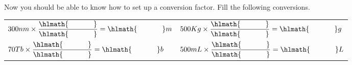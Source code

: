 \documentclass[main.tex]{subfiles}
\begin{document}
\begin{steps}
\begin{center}
\begin{tabular}{ p{6cm}   p{6cm}  }
 \end{tabular}\end{center}\vspace{.1cm}
   
         \newstep[]  Now you should be able to know how to set up a conversion factor. Fill the following conversions.

\begin{center}
 \begin{tabular}{ p{6cm}   p{6cm}  }
 $300nm	\times\dfrac{\hlmath{\hspace{35pt }}}{\hlmath{\hspace{35pt }}}=\hlmath{\hspace{35pt }}m$				&
 $500Kg\times\dfrac{\hlmath{\hspace{35pt }}}{\hlmath{\hspace{35pt }}}=\hlmath{\hspace{35pt }}g$							\\[0.5cm]     
 
  $70Tb\times\dfrac{\hlmath{\hspace{35pt }}}{\hlmath{\hspace{35pt }}}=\hlmath{\hspace{35pt }}b$				&
 $500mL\times\dfrac{\hlmath{\hspace{35pt }}}{\hlmath{\hspace{35pt }}}=\hlmath{\hspace{35pt }}L$							\\[0.5cm] 
 
 \end{tabular}\end{center}\vspace{.1cm}
   
   
   \end{steps}


 
\end{document}
